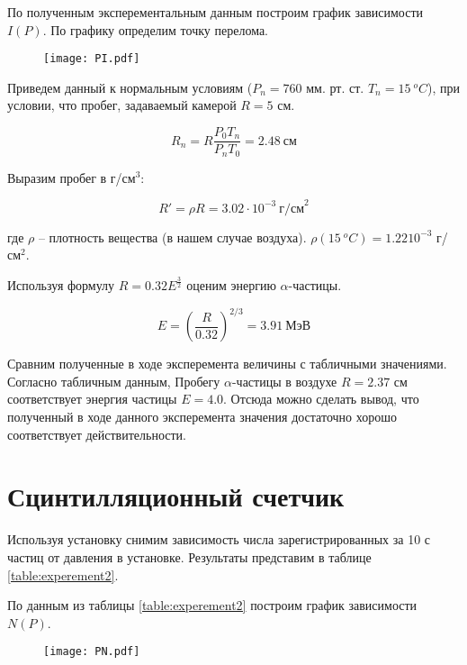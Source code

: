     

    По полученным эксперементальным данным построим график зависимости $I(P)$. По графику определим точку перелома.

    \begin{figure}
        \centering
        \texttt{[image: PI.pdf]}
        \caption{}
        \label{fig:1}
    \end{figure}

    \begin{center}
    \end{center}

    Приведем данный к нормальным условиям ($P_n = 760$ мм. рт. ст. $T_n = 15 ~ ^oC$), при условии,
    что пробег, задаваемый камерой $R = 5$ см.

    \[ R_n = R \frac{P_0 T_n}{P_n T_0} = 2.48 ~ \text{см} \]

    Выразим пробег в г/см$^3$:

    \[ R' = \rho R = 3.02 \cdot 10^{-3} ~ \text{г/см}^2 \]

    где $\rho$ -- плотность вещества (в нашем случае воздуха). $\rho(15 ~ ^oC) = 1.22 10^{-3}$ г/см$^2$.

    Используя формулу $R = 0.32 E^{\frac{3}{2}}$ оценим энергию $\alpha$-частицы.

    \[ E = \left(\frac{R}{0.32} \right)^{2/3} = 3.91 ~ \text{МэВ} \]

    Сравним полученные в ходе эксперемента величины с табличными значениями. Согласно табличным данным,
    Пробегу $\alpha$-частицы в воздухе $R = 2.37$ см соответствует энергия частицы $E = 4.0$. Отсюда
    можно сделать вывод, что полученный в ходе данного эксперемента значения достаточно хорошо соответствует 
    действительности.

    \section*{Сцинтилляционный счетчик}

    Используя установку снимим зависимость числа зарегистрированных за 10 с частиц от давления в установке.
    Результаты представим в таблице \ref{table:experement2}.

    

    По данным из таблицы \ref{table:experement2} построим график зависимости $N(P)$.

    \begin{figure}
        \centering
        \texttt{[image: PN.pdf]}
        \caption{}
        \label{fig:plot2}
    \end{figure}

